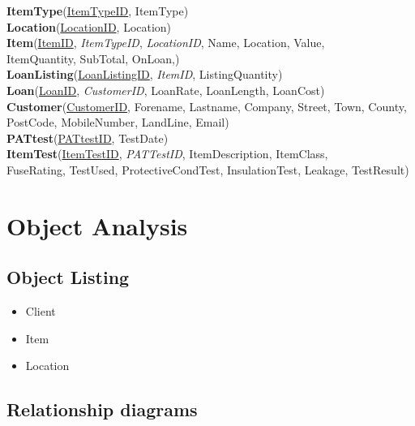 \noindent \textbf{ItemType}(\underline{ItemTypeID}, ItemType)\\

\noindent \textbf{Location}(\underline{LocationID}, Location)\\

\noindent \textbf{Item}(\underline{ItemID}, \emph{ItemTypeID}, \emph{LocationID}, Name, Location, Value,\\
ItemQuantity, SubTotal, OnLoan,)\\

\noindent \textbf{LoanListing}(\underline{LoanListingID}, \emph{ItemID}, ListingQuantity)\\

\noindent \textbf{Loan}(\underline{LoanID}, \emph{CustomerID}, LoanRate, LoanLength, LoanCost)\\

\noindent \textbf{Customer}(\underline{CustomerID}, Forename, Lastname, Company, Street, Town, County,\\
PostCode, MobileNumber, LandLine, Email)\\

\noindent \textbf{PATtest}(\underline{PATtestID}, TestDate)\\ 

\noindent \textbf{ItemTest}(\underline{ItemTestID}, \emph{PATTestID}, ItemDescription, ItemClass,\\
FuseRating, TestUsed, ProtectiveCondTest, InsulationTest, Leakage, TestResult)\\

\section{Object Analysis}

\subsection{Object Listing}

\begin{itemize}
    \item Client
    \item Item
    \item Location
\end{itemize}

\subsection{Relationship diagrams}

